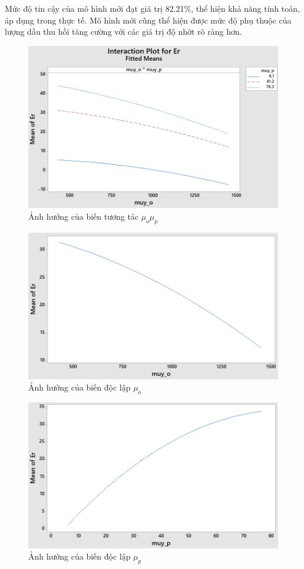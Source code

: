 \documentclass[12pt,a4paper]{article}
\begin{document}
	\newline
	Mức độ tin cậy của mô hình mới đạt giá trị 82.21\%, thể hiện khả năng tính toán, áp dụng trong thực tế. Mô hình mới cũng thể hiện được mức độ phụ thuộc của lượng dầu thu hồi tăng cường với các giá trị độ nhớt rõ ràng hơn.
	\begin{figure}[h]
		\centering
		\includegraphics[scale=.7]{Fig/Effectcrossover.PNG}
		\caption{Ảnh hưởng của biến tương tác $\mu_o\mu_p$}
	\end{figure}
	\begin{figure}[h]
		\centering
		\includegraphics[scale=.7]{Fig/effectofmuyoil.PNG}
		\caption{Ảnh hưởng của biến độc lập $\mu_o$}
	\end{figure}
	\begin{figure}[h]
		\centering
		\includegraphics[scale=0.7]{Fig/effectofmuyp.PNG}
		\caption{Ảnh hưởng của biến độc lập $\mu_p$}
	\end{figure}
	\clearpage
\end{document}
